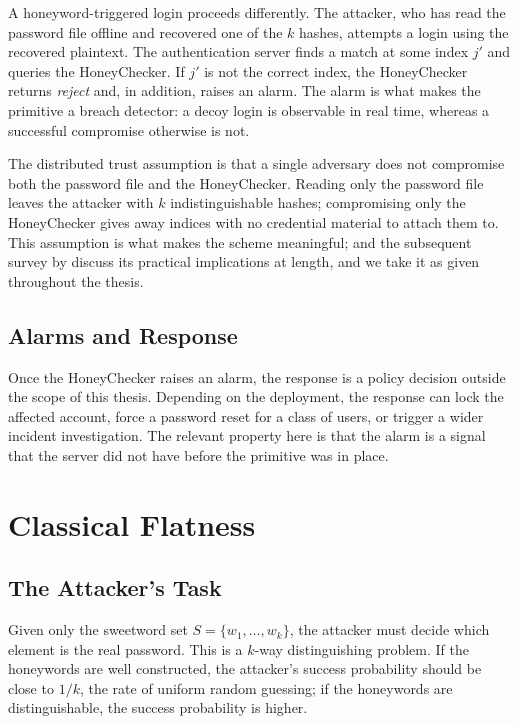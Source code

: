 A honeyword-triggered login proceeds differently. The attacker, who
has read the password file offline and recovered one of the $k$
hashes, attempts a login using the recovered plaintext. The
authentication server finds a match at some index $j'$ and queries the
HoneyChecker. If $j'$ is not the correct index, the HoneyChecker
returns \emph{reject} and, in addition, raises an alarm. The alarm is
what makes the primitive a breach detector: a decoy login is
observable in real time, whereas a successful compromise otherwise is
not.

The distributed trust assumption is that a single adversary does not
compromise both the password file and the HoneyChecker. Reading only
the password file leaves the attacker with $k$ indistinguishable
hashes; compromising only the HoneyChecker gives away indices with no
credential material to attach them to. This assumption is what makes
the scheme meaningful; \textcite{juels2013honeywords} and the
subsequent survey by \textcite{chakraborty2022hbat} discuss its
practical implications at length, and we take it as given throughout
the thesis.

\subsection{Alarms and Response}

Once the HoneyChecker raises an alarm, the response is a policy
decision outside the scope of this thesis. Depending on the
deployment, the response can lock the affected account, force a
password reset for a class of users, or trigger a wider incident
investigation. The relevant property here is that the alarm is a
signal that the server did not have before the primitive was in place.

\section{Classical Flatness}
\label{sec:bg-flatness}

\subsection{The Attacker's Task}

Given only the sweetword set $S = \{w_1, \ldots, w_k\}$, the attacker
must decide which element is the real password. This is a
$k$-way distinguishing problem. If the honeywords are well
constructed, the attacker's success probability should be close to
$1/k$, the rate of uniform random guessing; if the honeywords are
distinguishable, the success probability is higher.


